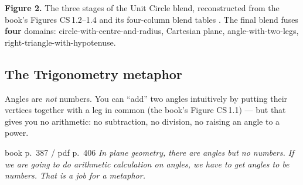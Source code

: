 \begin{center}
\end{center}
\begin{center}\begin{minipage}{0.95\textwidth}\footnotesize\color{slate}
\textbf{Figure 2.}\; The three stages of the Unit Circle blend, reconstructed from the book's Figures
CS\,1.2--1.4 and its four-column blend tables . The final blend fuses
\textbf{four} domains: circle-with-centre-and-radius, Cartesian plane, angle-with-two-legs,
right-triangle-with-hypotenuse.
\end{minipage}\end{center}

\subsection{The Trigonometry metaphor}

\begin{warmbox}[title={Why a metaphor is needed at all}]
Angles are \emph{not} numbers. You can ``add'' two angles intuitively by putting their vertices
together with a leg in common (the book's Figure CS\,1.1) --- but that gives you no arithmetic:
no subtraction, no division, no raising an angle to a power.
\begin{bookquote}{book p.~387 / pdf p.~406}
\textit{In plane geometry, there are angles but no numbers. If we are going to do arithmetic
calculation on angles, we have to get angles to be numbers. That is a job for a metaphor.}
\end{bookquote}
\end{warmbox}


